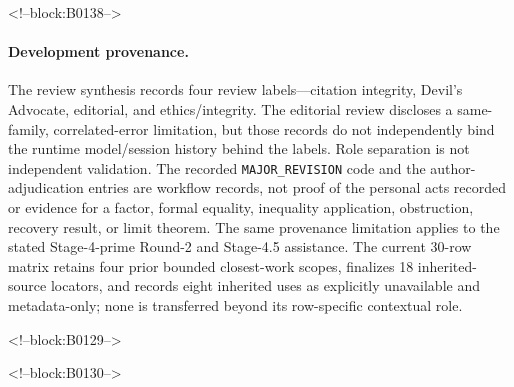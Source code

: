 \documentclass[11pt]{article}
\begin{document}
<!--block:B0138-->
\begingroup\sloppy
\paragraph{Development provenance.} The review synthesis records four review
labels---citation integrity, Devil's Advocate, editorial, and ethics/integrity.
The editorial review discloses a same-family, correlated-error limitation, but
those records do not independently bind the runtime model/session history behind
the labels. Role separation is not independent validation. The recorded
\texttt{MAJOR\_REVISION} code and the author-adjudication entries are workflow
records, not proof of the personal acts recorded or evidence for a factor, formal
equality, inequality application, obstruction, recovery result, or limit theorem.
The same provenance limitation applies to the stated Stage-4-prime Round-2 and
Stage-4.5 assistance. The current 30-row
matrix retains four prior bounded closest-work scopes, finalizes 18 inherited-source
locators, and records eight inherited uses as explicitly unavailable and
metadata-only; none is transferred beyond its row-specific contextual role.
\par\endgroup

<!--block:B0129-->



<!--block:B0130-->
\end{document}
